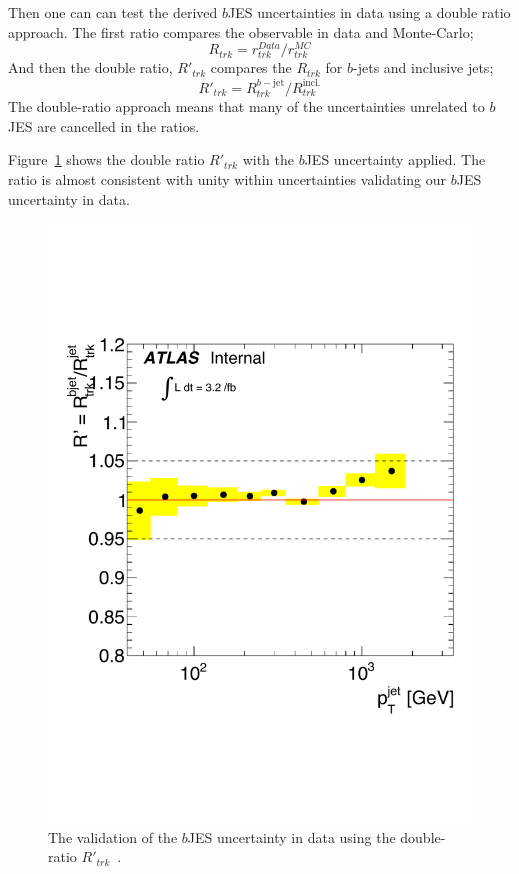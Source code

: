 Then one can can test the derived $b$JES uncertainties in data using a double ratio approach.
The first ratio compares the observable in data and Monte-Carlo;
\begin{equation} 
  R_{trk} = r_{trk}^{Data}/r_{trk}^{MC}
\end{equation}
And then the double ratio, $R'_{trk}$ compares the $R_{trk}$ for $b$-jets and inclusive jets;
\begin{equation} 
  R'_{trk} = R_{trk}^{b-\text{jet}}/R_{trk}^{\text{incl.}}
\end{equation}
The double-ratio approach means that many of the uncertainties unrelated to $b$JES are cancelled in the ratios.

Figure~\ref{fig:obj-bjets_bJES_Rprime} shows the double ratio $R'_{trk}$ with the $b$JES uncertainty applied.
The ratio is almost consistent with unity within uncertainties validating our $b$JES uncertainty in data.

  \begin{figure}[!ht]
  \begin{center}
      \includegraphics[width=0.6\linewidth, angle=0]{figs/Objects/bjets_bJES_Rprime_edit.pdf}
  \end{center}
  \caption[The validation of the $b$JES uncertainty in data using the double-ratio $R'_{trk}$.]
          {The validation of the $b$JES uncertainty in data using the double-ratio $R'_{trk}$~\cite{dibjet-int_mori16}.}
  \label{fig:obj-bjets_bJES_Rprime}
\end{figure}






